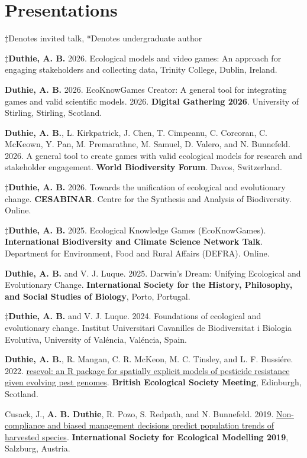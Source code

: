 \documentclass[letterpaper]{article}
\renewenvironment{itemize}{
  \begin{list}{}{
    \setlength{\leftmargin}{1.5em}
  }
}{
  \end{list}
}
\begin{document}
\section*{Presentations}
\begin{itemize}
\item $\ddagger$Denotes invited talk, *Denotes undergraduate author
\item $\ddagger${\bf Duthie, A. B.} 2026. Ecological models and video games: An approach for engaging stakeholders and collecting data, Trinity College, Dublin, Ireland.
\item {\bf Duthie, A. B.} 2026. EcoKnowGames Creator: A general tool for integrating games and valid scientific models. 2026. {\bf Digital Gathering 2026}. University of Stirling, Stirling, Scotland.
\item {\bf Duthie, A. B.}, L. Kirkpatrick, J. Chen, T. Cimpeanu, C. Corcoran, C. McKeown, Y. Pan, M. Premarathne, M. Samuel, D. Valero, and N. Bunnefeld. 2026. A general tool to create games with valid ecological models for research and stakeholder engagement. {\bf World Biodiversity Forum}. Davos, Switzerland.
\item $\ddagger${\bf Duthie, A. B.} 2026. Towards the unification of ecological and evolutionary change. {\bf CESABINAR}. Centre for the Synthesis and Analysis of Biodiversity. Online.
\item $\ddagger${\bf Duthie, A. B.} 2025. Ecological Knowledge Games (EcoKnowGames). {\bf International Biodiversity and Climate Science Network Talk}. Department for Environment, Food and Rural Affairs (DEFRA). Online.
\item {\bf Duthie, A. B.} and V. J. Luque. 2025. Darwin's Dream: Unifying Ecological and Evolutionary Change. {\bf International Society for the History, Philosophy, and Social Studies of Biology}, Porto, Portugal.
\item $\ddagger${\bf Duthie, A. B.} and V. J. Luque. 2024. Foundations of ecological and evolutionary change. Institut Universitari Cavanilles de Biodiversitat i Biologia Evolutiva, University of Val\'{e}ncia, Val\'{e}ncia, Spain.
\item {\bf Duthie, A. B.}, R. Mangan, C. R. McKeon, M. C. Tinsley, and L. F. Bussi\'{e}re. 2022. \href{http://bradduthie.github.io/talks/BES2022.pdf}{resevol: an R package for spatially explicit models of pesticide resistance given evolving pest genomes}. {\bf British Ecological Society Meeting}, Edinburgh, Scotland.
\item Cusack, J., {\bf A. B. Duthie}, R. Pozo, S. Redpath, and N. Bunnefeld. 2019. \href{http://bradduthie.github.io/talks/duthie_ISEM_2019.pdf}{Non-compliance and biased management decisions predict population trends of harvested species}. {\bf International Society for Ecological Modelling 2019}, Salzburg, Austria.

\end{itemize}
\end{document}
